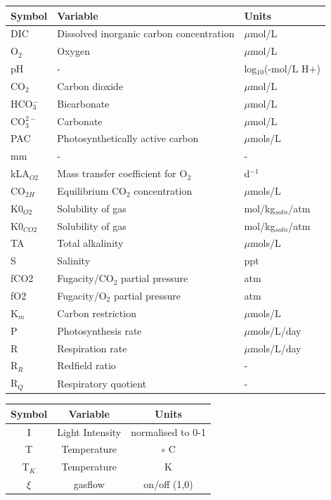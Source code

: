 \documentclass{ruthesis}
\begin{document}
\clearpage
\begin{tabular}{l l  | l}
	 \hline 
	Symbol & Variable & Units  \\ \hline
	DIC &  Dissolved inorganic carbon concentration & $\mu$mol/L  \\
	O$_2$ & Oxygen  &  $\mu$mol/L \\
	pH & -  & log$_{10}$(-mol/L H+)  \\
	CO$_2$ & Carbon dioxide  & $\mu$mol/L \\
	HCO$_3^-$ & Bicarbonate & $\mu$mol/L  \\
	CO$_3^{2-}$ & Carbonate  & $\mu$mol/L \\
	PAC & Photosynthetically active carbon & $\mu$mols/L  \\
	mm & - & - \\
	kLA$_{O2}$  & Mass transfer coefficient for O$_2$ &  d$^{-1}$  \\
	
	CO$_{2H}$  & Equilibrium CO$_2$ concentration  & $\mu$mols/L  \\
	
	K0$_{O2}$ &  Solubility of gas & mol/kg$_{soln}$/atm  \\
	K0$_{CO2}$ & Solubility of gas & mol/kg$_{soln}$/atm   \\
	TA  & Total alkalinity & $\mu$mols/L  \\
	S  & Salinity &  ppt  \\
	fCO2  & Fugacity/CO$_2$ partial pressure &  atm  \\
	fO2  & Fugacity/O$_2$ partial pressure &  atm \\
	
	K$_m$ & Carbon restriction & $\mu$mols/L \\
	
	P & Photosynthesis rate & $\mu$mols/L/day \\
	R & Respiration rate & $\mu$mols/L/day \\
	R$_R$ & Redfield ratio & - \\	
	R$_Q$ & Respiratory quotient & - \\
\end{tabular}

\begin{tabular}{c c  | c}
	 \hline
	 Symbol & Variable & Units  \\ \hline
	I &  Light Intensity  &  normalised to 0-1   \\
	T & Temperature & $\circ$ C  \\
	T$_K$ & Temperature &  K  \\
	$\xi$ & gasflow &  on/off (1,0)  \\
	
\end{tabular}
\end{document}
